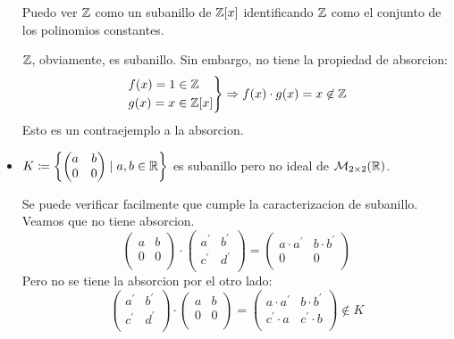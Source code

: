 \begin{example}
\begin{itemize}
		      Puedo ver \(\mathbb{Z} \) como un subanillo de \(\mathbb{Z}[x ]\) identificando \(\mathbb{Z} \) como el conjunto de los polinomios constantes.
		      
		      \(\mathbb{Z} \), obviamente, es subanillo. Sin embargo, no tiene la propiedad de absorcion:
		      \[
			      \begin{rcases}
				      f(x) = 1 \in \mathbb{Z} \\
				      g(x) = x \in \mathbb{Z}[x]
			      \end{rcases} \Rightarrow f(x) \cdot g(x) = x \not \in \mathbb{Z}
		      \]
		      Esto es un contraejemplo a la absorcion.
		      
		\item \(K \coloneqq \left\{\begin{pmatrix}
			      a & b \\
			      0 & 0 \\
		      \end{pmatrix} \mid a,b \in \mathbb{R}\right \}\)
		      es subanillo pero no ideal de \(\mathcal{\MakeUppercase{M}}_{2 \times 2}(\R )\).
		      
		      Se puede verificar facilmente que cumple la caracterizacion de subanillo. Veamos que no tiene absorcion.
		      \[
			      \begin{pmatrix}
				      a & b \\
				      0 & 0 \\
			      \end{pmatrix} \cdot \begin{pmatrix}
				      a^\prime & b^\prime \\
				      c^\prime & d^\prime \\
			      \end{pmatrix} = \begin{pmatrix}
				      a \cdot a^\prime & b \cdot b^\prime \\
				      0                & 0                \\
			      \end{pmatrix}
		      \]
		      Pero no se tiene la absorcion por el otro lado:
		      \[
			      \begin{pmatrix}
				      a^\prime & b^\prime \\
				      c^\prime & d^\prime \\
			      \end{pmatrix}\cdot \begin{pmatrix}
				      a & b \\
				      0 & 0 \\
			      \end{pmatrix} = \begin{pmatrix}
				      a \cdot a^\prime & b \cdot b^\prime \\
				      c^\prime \cdot a & c^\prime \cdot b \\
			      \end{pmatrix} \not\in K
		      \]
		      

\end{itemize}
\end{example}
